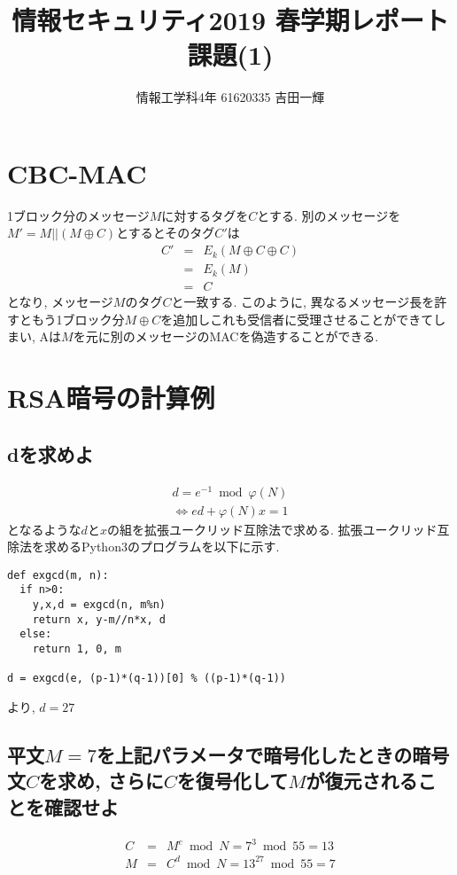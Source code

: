 \documentclass{jsarticle}
\title{情報セキュリティ2019 春学期レポート課題(1)}
\author{情報工学科4年 61620335 吉田一輝}
\date{}
\begin{document}
\maketitle
\section{CBC-MAC}
1ブロック分のメッセージ$M$に対するタグを$C$とする. 別のメッセージを$M' = M || (M \oplus C)$とするとそのタグ$C'$は 
\begin{eqnarray}
	C' &=& E_k(M \oplus C \oplus C) \nonumber \\
	&=& E_k(M) \nonumber \\
	&=& C 
\end{eqnarray}
となり, メッセージ$M$のタグ$C$と一致する. このように, 異なるメッセージ長を許すともう1ブロック分$M \oplus C$を追加しこれも受信者に受理させることができてしまい, Aは$M$を元に別のメッセージのMACを偽造することができる.

\section{RSA暗号の計算例}
\subsection{dを求めよ}
\begin{eqnarray}
	d = e^{-1} \bmod \varphi(N) \\
	\Leftrightarrow ed + \varphi(N)x = 1
\end{eqnarray}
となるような$d$と$x$の組を拡張ユークリッド互除法で求める. 拡張ユークリッド互除法を求めるPython3のプログラムを以下に示す.
\begin{lstlisting}
def exgcd(m, n):
  if n>0:
    y,x,d = exgcd(n, m%n)
    return x, y-m//n*x, d
  else:
    return 1, 0, m

d = exgcd(e, (p-1)*(q-1))[0] % ((p-1)*(q-1))
\end{lstlisting}
より, $d = 27$

\subsection{平文$M=7$を上記パラメータで暗号化したときの暗号文$C$を求め, さらに$C$を復号化して$M$が復元されることを確認せよ}
\begin{eqnarray}
	C &=& M^e \bmod N = 7^3 \bmod 55 = 13 \nonumber \\
	M &=& C^d \bmod N = 13^{27} \bmod 55 = 7 \nonumber
\end{eqnarray}
\end{document}
